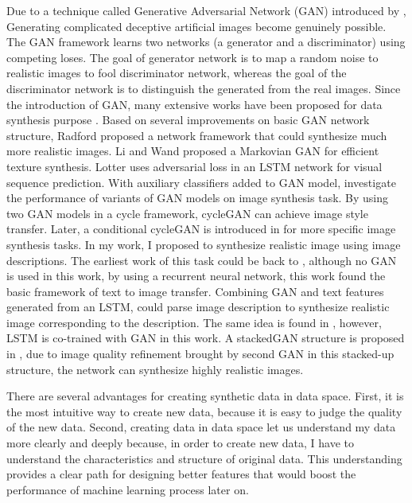 \documentclass{iitthesis}
\begin{document}
Due to a technique called Generative Adversarial Network (GAN) introduced by \cite{goodfellow2014generative}, Generating complicated deceptive artificial images become genuinely possible. The GAN framework learns two networks (a generator and a discriminator) using competing loses. The goal of generator network is to map a random noise to realistic images to fool discriminator network, whereas the goal of the discriminator network is to distinguish the generated from the real images. Since the introduction of GAN, many extensive works have been proposed for data synthesis purpose \cite{salimans2016improved}. Based on several improvements on basic GAN network structure, Radford \cite{radford2015unsupervised} proposed a network framework that could synthesize much more realistic images. Li and Wand \cite{johnson2016perceptual} proposed a Markovian GAN for efficient texture synthesis. Lotter uses adversarial loss in an LSTM network for visual sequence prediction. With auxiliary classifiers added to GAN model, \cite{odena2016conditional} investigate the performance of variants of GAN models on image synthesis task. By using two GAN models in a cycle framework, cycleGAN \cite{zhu2017unpaired} can achieve image style transfer. Later, a conditional cycleGAN is introduced in \cite{lu2017conditional} for more specific image synthesis tasks. In my work, I proposed to synthesize realistic image using image descriptions. The earliest work of this task could be back to \cite{mansimov2015generating}, although no GAN is used in this work, by using a recurrent neural network, this work found the basic framework of text to image transfer. Combining GAN and text features generated from an LSTM, \cite{reed2016generative} could parse image description to synthesize realistic image corresponding to the description. The same idea is found in \cite{DBLP:journals/corr/DongZMG17}, however, LSTM is co-trained with GAN in this work. A stackedGAN structure is proposed in \cite{zhang2016stackgan}, due to image quality refinement brought by second GAN in this stacked-up structure, the network can synthesize highly realistic images.


 \label{dataspace: solution}

There are several advantages for creating synthetic data in data space. First, it is the most intuitive way to create new data, because it is easy to judge the quality of the new data. Second, creating data in data space let us understand my data more clearly and deeply because, in order to create new data, I have to understand the characteristics and structure of original data. This understanding provides a clear path for designing better features that would boost the performance of machine learning process later on. 
\end{document}
